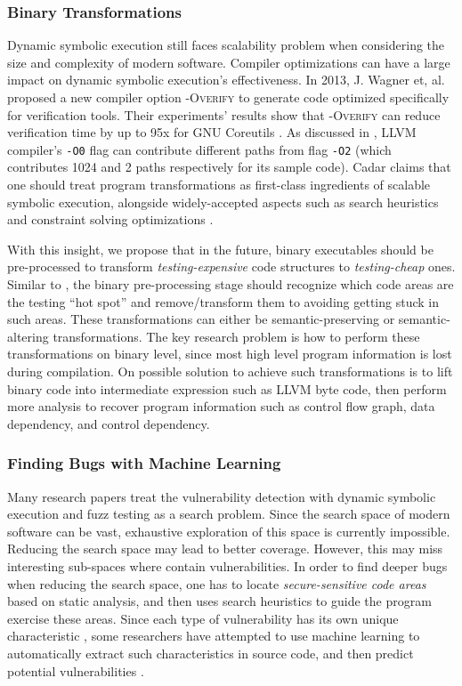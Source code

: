 \subsubsection{Binary Transformations}
Dynamic symbolic execution still faces scalability problem 
when considering the size and complexity of modern software. 
Compiler optimizations can have a large impact on dynamic 
symbolic execution's effectiveness. 
In 2013, J. Wagner et, al. proposed a new compiler option 
\textsc{-Overify} to generate code optimized specifically 
for verification tools. Their experiments' results show that 
\textsc{-Overify} can reduce verification time by up to 
95x for GNU Coreutils \cite{wagner2013overify}. As discussed 
in \cite{Cadar:2015:TPT}, LLVM compiler's \texttt{-O0} flag 
can contribute different paths from flag \texttt{-O2} (which 
contributes 1024 and 2 paths respectively for its sample code).
Cadar claims that one should treat program transformations as 
first-class ingredients of scalable symbolic execution, 
alongside widely-accepted aspects such as search heuristics 
and constraint solving optimizations \cite{Cadar:2015:TPT}. 
 
With this insight, we propose that in the future, binary executables 
should be pre-processed to transform \textit{testing-expensive} 
code structures to \textit{testing-cheap} ones.
Similar to \cite{wagner2015high}, the binary pre-processing stage 
should recognize which code areas are the testing ``hot spot'' and 
remove/transform them to avoiding getting stuck in such areas.
These transformations can either be semantic-preserving or 
semantic-altering transformations. The key research problem is how 
to perform these transformations on binary level, since most 
high level program information is lost during compilation. 
On possible solution to achieve such transformations is to lift 
binary code into intermediate expression such as LLVM byte code, 
then perform more analysis to recover program information such 
as control flow graph, data dependency, and control dependency. 

\subsubsection{Finding Bugs with Machine Learning}
Many research papers treat the vulnerability detection with dynamic 
symbolic execution and fuzz testing as a search problem.
Since the search space of modern software can be vast, exhaustive 
exploration of this space is currently impossible.
Reducing the search space may lead to better coverage.
However, this may miss interesting sub-spaces where contain vulnerabilities. 
In order to find deeper bugs when reducing the search space, 
one has to locate \textit{secure-sensitive code areas} based on 
static analysis, and then uses search heuristics to guide 
the program exercise these areas.
Since each type of vulnerability has its own unique 
characteristic \cite{MBishop:ATBOC, wang2009intscope, wang2010ricb}, 
some researchers have attempted to use machine learning to 
automatically extract such characteristics in source code, and 
then predict potential vulnerabilities \cite{VCCFinder, Yamaguchi:2011:VEA}.

